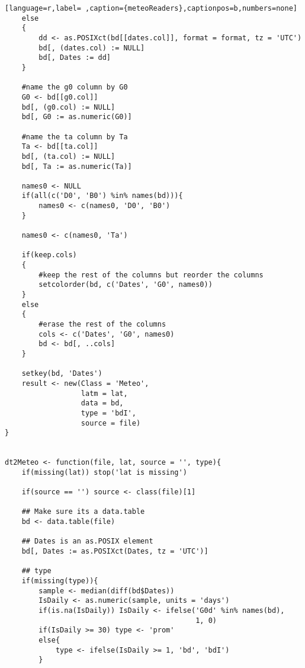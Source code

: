 \begin{lstlisting}[language=r,label= ,caption={meteoReaders},captionpos=b,numbers=none]
    else
    {
        dd <- as.POSIXct(bd[[dates.col]], format = format, tz = 'UTC')
        bd[, (dates.col) := NULL]
        bd[, Dates := dd]
    }

    #name the g0 column by G0
    G0 <- bd[[g0.col]]
    bd[, (g0.col) := NULL]
    bd[, G0 := as.numeric(G0)]

    #name the ta column by Ta
    Ta <- bd[[ta.col]]
    bd[, (ta.col) := NULL]
    bd[, Ta := as.numeric(Ta)]

    names0 <- NULL
    if(all(c('D0', 'B0') %in% names(bd))){
        names0 <- c(names0, 'D0', 'B0')
    }

    names0 <- c(names0, 'Ta')

    if(keep.cols)
    {
        #keep the rest of the columns but reorder the columns
        setcolorder(bd, c('Dates', 'G0', names0))
    }
    else
    {
        #erase the rest of the columns
        cols <- c('Dates', 'G0', names0)
        bd <- bd[, ..cols]
    }

    setkey(bd, 'Dates')
    result <- new(Class = 'Meteo',
                  latm = lat,
                  data = bd,
                  type = 'bdI',
                  source = file)
}


dt2Meteo <- function(file, lat, source = '', type){
    if(missing(lat)) stop('lat is missing')

    if(source == '') source <- class(file)[1]

    ## Make sure its a data.table
    bd <- data.table(file)

    ## Dates is an as.POSIX element
    bd[, Dates := as.POSIXct(Dates, tz = 'UTC')]

    ## type
    if(missing(type)){
        sample <- median(diff(bd$Dates))
        IsDaily <- as.numeric(sample, units = 'days')
        if(is.na(IsDaily)) IsDaily <- ifelse('G0d' %in% names(bd),
                                             1, 0)
        if(IsDaily >= 30) type <- 'prom'
        else{
            type <- ifelse(IsDaily >= 1, 'bd', 'bdI') 
        }


\end{lstlisting}
